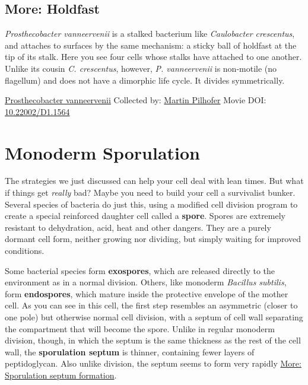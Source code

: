 \documentclass[]{tufte-book}
\begin{document}
\hypertarget{Holdfast}{%
\subsection*{More: Holdfast}\label{Holdfast}}

\emph{Prosthecobacter vanneervenii} is a stalked bacterium like \emph{Caulobacter crescentus}, and attaches to surfaces by the same mechanism: a sticky ball of holdfast at the tip of its stalk. Here you see four cells whose stalks have attached to one another. Unlike its cousin \emph{C. crescentus}, however, \emph{P. vanneervenii} is non-motile (no flagellum) and does not have a dimorphic life cycle. It divides symmetrically.



\hypertarget{htmlwidget-53e710a7c4c05df46959}{}

\label{fig:8-4a}\protect\hyperlink{tree}{Prosthecobacter vanneervenii} Collected by: \protect\hyperlink{martin_pilhofer}{Martin Pilhofer} Movie DOI: \href{https://doi.org/10.22002/D1.1564}{10.22002/D1.1564}

\hypertarget{monoderm-sporulation}{%
\section{Monoderm Sporulation}\label{monoderm-sporulation}}

The strategies we just discussed can help your cell deal with lean times. But what if things get \emph{really} bad? Maybe you need to build your cell a survivalist bunker. Several species of bacteria do just this, using a modified cell division program to create a special reinforced daughter cell called a \textbf{spore}. Spores are extremely resistant to dehydration, acid, heat and other dangers. They are a purely dormant cell form, neither growing nor dividing, but simply waiting for improved conditions.

Some bacterial species form \textbf{exospores}, which are released directly to the environment as in a normal division. Others, like monoderm \emph{Bacillus subtilis}, form \textbf{endospores}, which mature inside the protective envelope of the mother cell. As you can see in this cell, the first step resembles an asymmetric (closer to one pole) but otherwise normal cell division, with a septum of cell wall separating the compartment that will become the spore. Unlike in regular monoderm division, though, in which the septum is the same thickness as the rest of the cell wall, the \textbf{sporulation septum} is thinner, containing fewer layers of peptidoglycan. Also unlike division, the septum seems to form very rapidly \protect\hyperlink{Sporulation_septum_formation}{More: Sporulation septum formation}.
\end{document}
